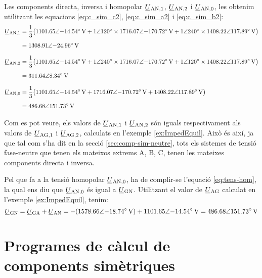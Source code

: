 \begin{exemple}
    Les components directa, inversa i homopolar $\cmplx{U}\ped{AN,1}$, $\cmplx{U}\ped{AN,2}$ i
    $\cmplx{U}\ped{AN,0}$, les obtenim utilitzant les equacions
    \eqref{eq:c_sim_c2}, \eqref{eq:c_sim_a2} i \eqref{eq:c_sim_b2}:
    \begin{align*}
        \cmplx{U}\ped{AN,1} &= \frac{1}{3} \big(
        \complexqty{1101,65:-14,54}{V} + \complexnum{1:120} \times \complexqty{1716,07:-170,72}{V} +
        \complexnum{1:240} \times \complexqty{1408,22:117,89}{V} \big) \\[1ex]
        &= \complexqty{1308,91:-24,96}{V} \\[1.5ex]
        \cmplx{U}\ped{AN,2} &= \frac{1}{3} \big(
        \complexqty{1101,65:-14,54}{V} + \complexnum{1:240} \times \complexqty{1716,07:-170,72}{V} +
        \complexnum{1:120} \times \complexqty{1408,22:117,89}{V} \big) \\[1ex]
        &= \complexqty{311,64:8,34}{V} \\[1.5ex]
        \cmplx{U}\ped{AN,0} &= \frac{1}{3} \big(
        \complexqty{1101,65:-14,54}{V} + \complexqty{1716,07:-170,72}{V} + \complexqty{1408,22:117,89}{V} \big)  \\[1ex]
        &= \complexqty{486,68:151,73}{V}
    \end{align*}

    Com es pot veure, els valors de $\cmplx{U}\ped{AN,1}$ i $\cmplx{U}\ped{AN,2}$ són iguals respectivament als valors de $\cmplx{U}\ped{AG,1}$ i $\cmplx{U}\ped{AG,2}$, calculats en l'exemple \ref{ex:ImpedEquil}.
    Això és així, ja que tal com s'ha dit en la secció \vref{sec:comp-sim-neutre}, tots els sistemes de tensió fase-neutre que tenen els mateixos extrems A, B, C, tenen les mateixes components directa i inversa.

    Pel que fa a la tensió homopolar $\cmplx{U}\ped{AN,0}$, ha de complir-se l'equació \eqref{eq:tens-hom}, la qual ens diu que $\cmplx{U}\ped{AN,0}$ és igual a $\cmplx{U}\ped{GN}$. Utilitzant el valor de  $\cmplx{U}\ped{AG}$ calculat en l'exemple \ref{ex:ImpedEquil}, tenim:
    \[
        \cmplx{U}\ped{GN} = \cmplx{U}\ped{GA} + \cmplx{U}\ped{AN} = -(\complexqty{1578,66:-18,74}{V}) +
        \complexqty{1101,65:-14,54}{V} = \complexqty{486,68:151,73}{V}
    \]
\end{exemple}

\section{Programes de càlcul de components simètriques}\label{sec:calcul-comp-sim}

